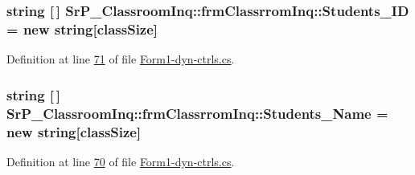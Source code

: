 \hypertarget{class_sr_p___classroom_inq_1_1frm_classrrom_inq_a68a93f6247168ebfa500f7afe83cce94}{
\subsubsection[{\-Students\-\_\-\-I\-D}]{\setlength{\rightskip}{0pt plus 5cm}string \mbox{[}$\,$\mbox{]} {\bf \-Sr\-P\-\_\-\-Classroom\-Inq\-::frm\-Classrrom\-Inq\-::\-Students\-\_\-\-I\-D} = new string\mbox{[}{\bf class\-Size}\mbox{]}}}
\label{class_sr_p___classroom_inq_1_1frm_classrrom_inq_a68a93f6247168ebfa500f7afe83cce94}


\-Definition at line \hyperlink{_form1-dyn-ctrls_8cs_source_l00071}{71} of file \hyperlink{_form1-dyn-ctrls_8cs_source}{\-Form1-\/dyn-\/ctrls.\-cs}.

\hypertarget{class_sr_p___classroom_inq_1_1frm_classrrom_inq_ad595ee0cb55235eda789723fe8967521}{
\subsubsection[{\-Students\-\_\-\-Name}]{\setlength{\rightskip}{0pt plus 5cm}string \mbox{[}$\,$\mbox{]} {\bf \-Sr\-P\-\_\-\-Classroom\-Inq\-::frm\-Classrrom\-Inq\-::\-Students\-\_\-\-Name} = new string\mbox{[}{\bf class\-Size}\mbox{]}}}
\label{class_sr_p___classroom_inq_1_1frm_classrrom_inq_ad595ee0cb55235eda789723fe8967521}


\-Definition at line \hyperlink{_form1-dyn-ctrls_8cs_source_l00070}{70} of file \hyperlink{_form1-dyn-ctrls_8cs_source}{\-Form1-\/dyn-\/ctrls.\-cs}.


